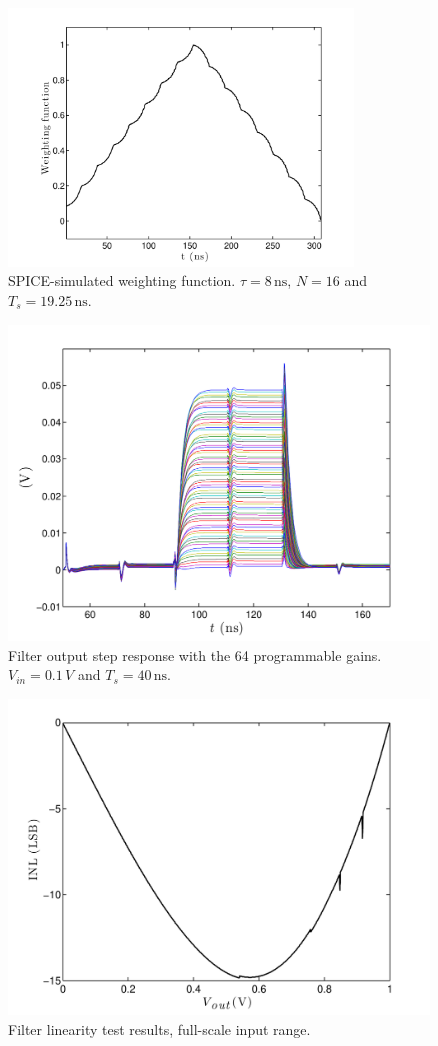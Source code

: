 \begin{figure}[!t]
	\centering
	\includegraphics[width=3.6in]{./Test/sim_wf}
	\caption{SPICE-simulated weighting function. $\tau=8\,\text{ns}$, $N=16$ and $T_s=19.25\,\text{ns}$.}\label{fig:sim_wf}
\end{figure}


\begin{figure}[!t]
	\centering
	\includegraphics[width=4.4in]{./Test/gain_curves.pdf}
	\caption{Filter output step response with the 64 programmable gains. \mbox{$V_\textit{in}=0.1\,V$} and \mbox{$T_s=40\,\text{ns}$}.}\label{fig:gain_curves}
\end{figure}

\begin{figure}[!t]
	\centering
	\includegraphics[width=4.4in]{./Test/linearity.pdf}
	\caption{Filter linearity test results, full-scale input range.}\label{fig:gain_curves}
\end{figure}

